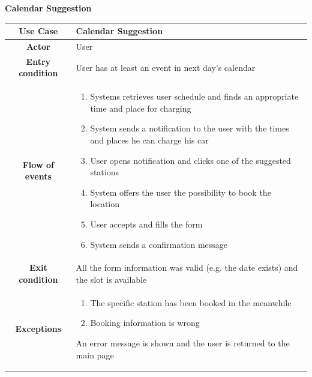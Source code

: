 \documentclass[table, 12pt]{article} %
\begin{document}
\begin{itemize}
            \begin{table}[H]
                \item[] \textbf{Calendar Suggestion}
                \item[]
                \centering
                \begin{tabular}{|c |m{}|}
                    \hline
                    \textbf{Use Case} & Calendar Suggestion\\ \hline
                    \textbf{Actor} & User\\ \hline
                    \textbf{Entry condition} & User has at least an event in next day's calendar \\  \hline
                    \textbf{Flow of events} & \begin{enumerate}
                                                \item Systems retrieves user schedule and finds an appropriate time and place for charging
                                                \item System sends a notification to the user with the times and places he can charge his car
                                                \item User opens notification and clicks one of the suggested stations
                                                \item System offers the user the possibility to book the location
                                                \item User accepts and fills the form
                                                \item System sends a confirmation message
                                            \end{enumerate}\\ \hline
                    \textbf{Exit condition} &  All the form information was valid (e.g. the date exists) and the slot is available\\ \hline
                    \textbf{Exceptions} &  \begin{enumerate}
                        \item The specific station has been booked in the meanwhile
                        \item Booking information is wrong
                    \end{enumerate}
                    An error message is shown and the user is returned to the main page\\ \hline
                \end{tabular}
            \end{table}


\end{itemize}
\end{document}
